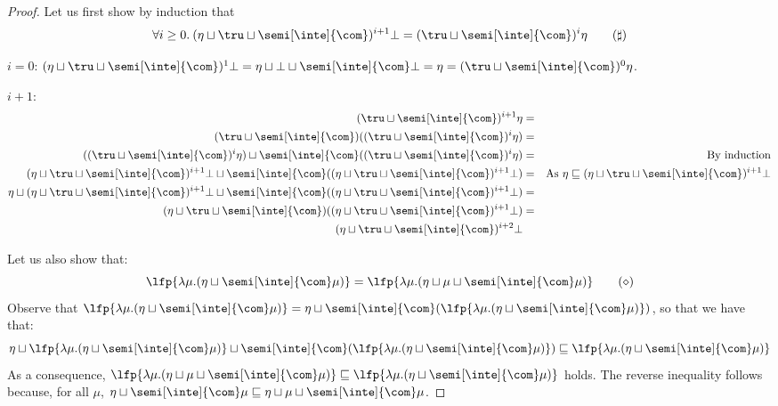 \begin{proof}
  Let us first show by induction that 
  \begin{equation}\label{prop2}
    \forall i\geq 0.\: (\eta \sqcup \tru \sqcup \semi[\inte]{\com})^{i+1} \bot = (\tru \sqcup \semi[\inte]{\com})^{i} \eta \tag{\(\sharp\)}
  \end{equation}

  \noindent
  \(i=0\): \( (\eta \sqcup \tru \sqcup \semi[\inte]{\com})^{1} \bot = \eta \sqcup \bot \sqcup \semi[\inte]{\com}\bot = \eta = 
  (\tru \sqcup \semi[\inte]{\com})^{0} \eta\).
  
  \noindent
  \(i+1\):  
  \begin{align*}
    (\tru \sqcup \semi[\inte]{\com})^{i+1} \eta & = & \\
    (\tru \sqcup \semi[\inte]{\com})((\tru \sqcup \semi[\inte]{\com})^{i} \eta) & = & \\
    ((\tru \sqcup \semi[\inte]{\com})^{i} \eta) \sqcup  \semi[\inte]{\com}((\tru \sqcup \semi[\inte]{\com})^{i} \eta) & = & \text{By induction}\\
    (\eta \sqcup \tru \sqcup \semi[\inte]{\com})^{i+1} \bot \sqcup \semi[\inte]{\com}((\eta \sqcup \tru \sqcup \semi[\inte]{\com})^{i+1}\bot ) &= & \text{As } \eta \sqsubseteq (\eta \sqcup \tru \sqcup \semi[\inte]{\com})^{i+1} \bot \\
    \eta \sqcup (\eta \sqcup \tru \sqcup \semi[\inte]{\com})^{i+1} \bot \sqcup \semi[\inte]{\com}((\eta \sqcup \tru \sqcup \semi[\inte]{\com})^{i+1}\bot ) & = & \\
    (\eta \sqcup \tru \sqcup \semi[\inte]{\com}) ((\eta \sqcup \tru \sqcup \semi[\inte]{\com})^{i+1} \bot) & = & \\
    (\eta \sqcup \tru \sqcup \semi[\inte]{\com})^{i+2} \bot & &
  \end{align*}

  Let us also show that:
  \begin{equation}\label{prop3}
    \lfp{\lambda \mu. (\eta \sqcup \semi[\inte]{\com} \mu)} =
    \lfp{\lambda \mu. (\eta \sqcup \mu \sqcup \semi[\inte]{\com} \mu)}\tag{\(\diamond\)}
  \end{equation}
  Observe that \(\lfp{\lambda \mu. (\eta \sqcup \semi[\inte]{\com} \mu)} = \eta \sqcup  \semi[\inte]{\com}(\lfp{\lambda \mu. (\eta \sqcup \semi[\inte]{\com} \mu)})\), so that we have that:
  \[
    \eta \sqcup  \lfp{\lambda \mu. (\eta \sqcup \semi[\inte]{\com} \mu)} \sqcup \semi[\inte]{\com}(\lfp{\lambda \mu. (\eta \sqcup \semi[\inte]{\com} \mu)})
    \sqsubseteq \lfp{\lambda \mu. (\eta \sqcup \semi[\inte]{\com} \mu)}
  \]
  As a consequence, \(\lfp{\lambda \mu. (\eta \sqcup \mu \sqcup \semi[\inte]{\com} \mu)}\sqsubseteq \lfp{\lambda \mu. (\eta \sqcup \semi[\inte]{\com} \mu)}\) holds. The reverse inequality follows because, for all \(\mu\), 
  \(\eta \sqcup \semi[\inte]{\com} \mu \sqsubseteq \eta \sqcup \mu \sqcup \semi[\inte]{\com} \mu\).


\end{proof}
